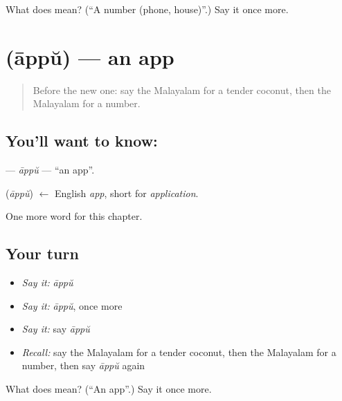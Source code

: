 \begin{tcolorbox}[breakable,colback=teal!4,colframe=teal!35!black,title={Before you move on}]
What does  mean? (\textquotedblleft{}A number (phone, house)\textquotedblright{}.) Say it once more.
\end{tcolorbox}
\section[\texorpdfstring{\ml{ആപ്പ്} (āppŭ)}{ആപ്പ് (āppŭ)}]{ (āppŭ) — an app}

\label{lesson:ML-C250-appu}



\begin{quote}
Before the new one: say the Malayalam for a tender coconut, then the Malayalam for a number.
\end{quote}

\subsection*{You'll want to know: }
\textbf{} — \emph{āppŭ} — \textquotedblleft{}an app\textquotedblright{}.

\begin{cousinweb}
\textbf{} (\emph{āppŭ}) $\leftarrow$ English \emph{app}, short for \emph{application}.
\end{cousinweb}

\begin{grammarlens}[title={What you've built}]
One more word for this chapter.
\end{grammarlens}

\subsection*{Your turn}
\begin{itemize}
\raggedright
  \item \emph{Say it:} \emph{āppŭ}
  \item \emph{Say it:} \emph{āppŭ}, once more
  \item \emph{Say it:} say \emph{āppŭ}
  \item \emph{Recall:} say the Malayalam for a tender coconut, then the Malayalam for a number, then say \emph{āppŭ} again
\end{itemize}

\begin{tcolorbox}[breakable,colback=teal!4,colframe=teal!35!black,title={Before you move on}]
What does  mean? (\textquotedblleft{}An app\textquotedblright{}.) Say it once more.
\end{tcolorbox}
